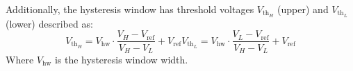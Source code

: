 Additionally, the hysteresis window has threshold voltages $V_{\mathrm{th}_{H}}$ (upper) and $V_{\mathrm{th}_{L}}$ (lower) described as:
\begin{subequations} \label{eq:hysteresis_window}
	\begin{equation} \label{eq:hysteresis_window_a}
		V_{\mathrm{th}_{H}} = V_{\mathrm{hw}} \cdot \frac{V_{H} - V_{\mathrm{ref}}}{V_{H} - V_{L}} + V_{\mathrm{ref}}
	\end{equation}
	\begin{equation} \label{eq:hysteresis_window_b}
		V_{\mathrm{th}_{L}} = V_{\mathrm{hw}} \cdot \frac{V_{L} - V_{\mathrm{ref}}}{V_{H} - V_{L}} + V_{\mathrm{ref}}
	\end{equation}
\end{subequations}
Where $V_{\mathrm{hw}}$ is the hysteresis window width.

